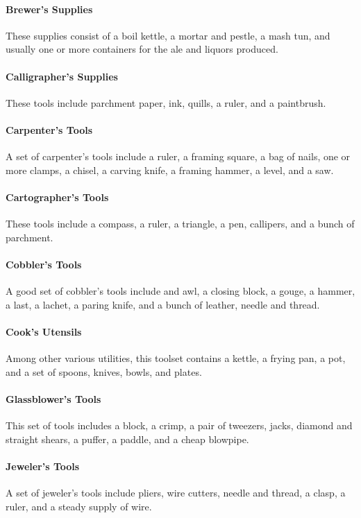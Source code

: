     \paragraph{Brewer's Supplies}
        These supplies consist of a boil kettle, a mortar and pestle, a mash tun, and usually one or more containers for the ale and liquors produced.
    \paragraph{Calligrapher's Supplies}
        These tools include parchment paper, ink, quills, a ruler, and a paintbrush.
    \paragraph{Carpenter's Tools}
        A set of carpenter's tools include a ruler, a framing square, a bag of nails, one or more clamps, a chisel, a carving knife, a framing hammer, a level, and a saw.
    \paragraph{Cartographer's Tools}
        These tools include a compass, a ruler, a triangle, a pen, callipers, and a bunch of parchment.
    \paragraph{Cobbler's Tools}
        A good set of cobbler's tools include and awl, a closing block, a gouge, a hammer, a last, a lachet, a paring knife, and a bunch of leather, needle and thread.
    \paragraph{Cook's Utensils}
        Among other various utilities, this toolset contains a kettle, a frying pan, a pot, and a set of spoons, knives, bowls, and plates.
    \paragraph{Glassblower's Tools}
        This set of tools includes a block, a crimp, a pair of tweezers, jacks, diamond and straight shears, a puffer, a paddle, and a cheap blowpipe.
    \paragraph{Jeweler's Tools}
        A set of jeweler's tools include pliers, wire cutters, needle and thread, a clasp, a ruler, and a steady supply of wire.
